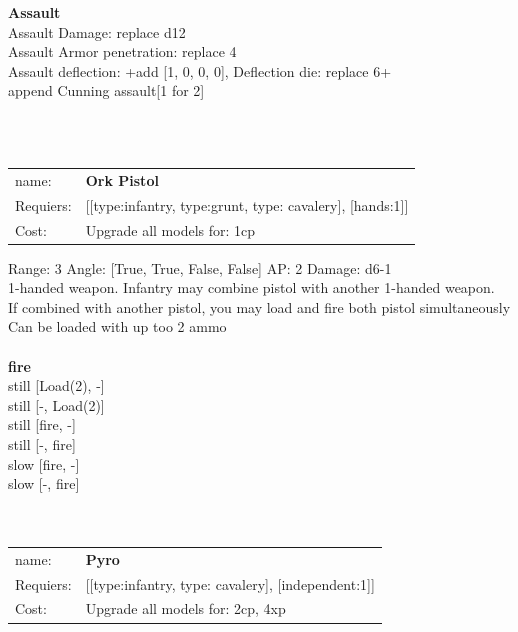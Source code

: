 {\bf Assault} \ \\
Assault Damage: replace d12
\\ 
Assault Armor penetration: replace 4 
\\ 
Assault deflection: +add [1, 0, 0, 0], Deflection die: replace 6+
\\ 

append Cunning assault[1 for 2]


\ \\
\ \\
\begin{tabular}{ll}
name: & {\bf Ork Pistol } \\
Requiers: & [[type:infantry, type:grunt, type: cavalery], [hands:1]] \\
Cost: & Upgrade all models for: 1cp \\
\end{tabular}



Range: 3  Angle: [True, True, False, False] AP: 2 Damage: d6-1 \\
1-handed weapon. Infantry may combine pistol with another 1-handed weapon.\\ 
If combined with another pistol, you may load and fire both pistol simultaneously\\ 
Can be loaded with up too 2 ammo\\ 







\ \\ {\bf fire } \\
still [Load(2), -] \\
still [-, Load(2)] \\
still [fire, -] \\
still [-, fire] \\
slow [fire, -] \\
slow [-, fire] \\

\ \\
\ \\
\begin{tabular}{ll}
name: & {\bf Pyro } \\
Requiers: & [[type:infantry, type: cavalery], [independent:1]] \\
Cost: & Upgrade all models for: 2cp, 4xp \\
\end{tabular}



